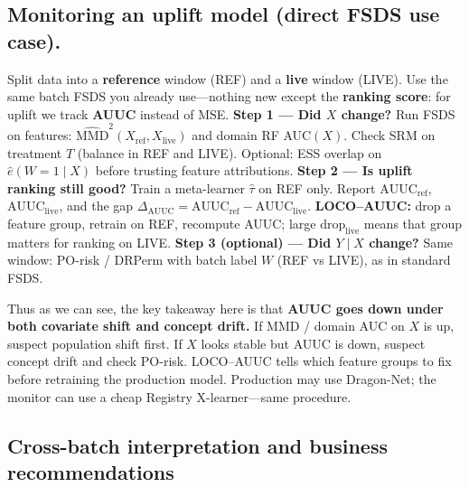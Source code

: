 \documentclass{article}
\begin{document}
\subsection{Monitoring an uplift model (direct FSDS use case).}
Split data into a \textbf{reference} window (REF) and a \textbf{live} window (LIVE).
Use the same batch FSDS you already use---nothing new except the \textbf{ranking score}: for uplift we track \textbf{AUUC} instead of MSE.
\medskip
\noindent\textbf{Step 1 --- Did $X$ change?}
Run FSDS on features: $\widehat{\mathrm{MMD}}^2(X_{\mathrm{ref}},X_{\mathrm{live}})$ and domain RF AUC$(X)$.
Check SRM on treatment $T$ (balance in REF and LIVE).
Optional: ESS overlap on $\hat e(W{=}1\mid X)$ before trusting feature attributions.
\noindent\textbf{Step 2 --- Is uplift ranking still good?}\quad
Train a meta-learner $\hat\tau$ on REF only.
Report $\mathrm{AUUC}_{\mathrm{ref}}$, $\mathrm{AUUC}_{\mathrm{live}}$, and the gap $\Delta_{\mathrm{AUUC}}=\mathrm{AUUC}_{\mathrm{ref}}-\mathrm{AUUC}_{\mathrm{live}}$.
\textbf{LOCO--AUUC:} drop a feature group, retrain on REF, recompute AUUC; large $\mathrm{drop}_{\mathrm{live}}$ means that group matters for ranking on LIVE.
\noindent\textbf{Step 3 (optional) --- Did $Y\mid X$ change?}\quad
Same window: PO-risk / DRPerm with batch label $W$ (REF vs LIVE), as in standard FSDS.


\par Thus as we can see, the key takeaway here is that \textbf{AUUC goes down under both covariate shift and concept drift.}
If MMD / domain AUC on $X$ is up, suspect population shift first.
If $X$ looks stable but AUUC is down, suspect concept drift and check PO-risk.
LOCO--AUUC tells which feature groups to fix before retraining the production model.
Production may use Dragon-Net; the monitor can use a cheap Registry X-learner---same procedure.

\subsection{Cross-batch interpretation and business recommendations}
\label{sec:cross-batch-business}
\end{document}
